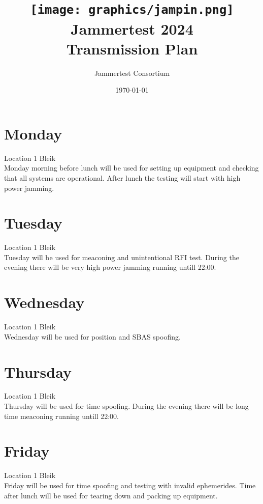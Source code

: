 \documentclass[a4paper]{book}
\title{\texttt{[image: graphics/jampin.png]}\\ Jammertest 2024 \\ \huge{Transmission Plan}}
\author{Jammertest Consortium}
\date{\today \\ \DTMcurrenttime}
\begin{document}
\maketitle

\tableofcontents
\restoregeometry



\begin{landscape}

\chapter{Monday}
\Large Location 1 Bleik \\
Monday morning before lunch will be used for setting up equipment and checking that all systems are operational. After lunch the testing will start with high power jamming.

%

\chapter{Tuesday}
\Large Location 1 Bleik \\
Tuesday will be used for meaconing and unintentional RFI test. During the evening there will be very high power jamming running untill 22:00.

%

\chapter{Wednesday}
\Large Location 1 Bleik \\
Wednesday will be used for position and SBAS spoofing. 

%

\chapter{Thursday}
\Large Location 1 Bleik \\
Thursday will be used for time spoofing. During the evening there will be long time meaconing running untill 22:00.

%

\chapter{Friday}
\Large Location 1 Bleik \\
Friday will be used for time spoofing and testing with invalid ephemerides. Time after lunch will be used for tearing down and packing up equipment.

%

\end{landscape}
\end{document}
